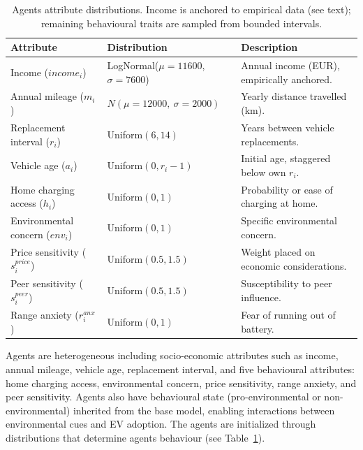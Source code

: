 \documentclass[11pt]{article}
\begin{document}
\begin{table}[ht]
\centering
\caption{Agents attribute distributions. Income is anchored to empirical
data (see text); remaining behavioural traits are sampled from bounded
intervals.}
\label{tab:attributes}
\begin{tabular}{lll}
\toprule
\textbf{Attribute} & \textbf{Distribution} & \textbf{Description} \\
\midrule
Income ($income_i$) & LogNormal($\mu=11600$, $\sigma=7600$) &
  Annual income (EUR), empirically anchored. \\
Annual mileage ($m_i$) & $N(\mu=12000,\ \sigma=2000)$ &
  Yearly distance travelled (km). \\
Replacement interval ($r_i$) & Uniform$(6, 14)$ &
  Years between vehicle replacements. \\
Vehicle age ($a_i$) & Uniform$(0, r_i - 1)$ &
  Initial age, staggered below own $r_i$. \\
Home charging access ($h_i$) & Uniform$(0, 1)$ &
  Probability or ease of charging at home. \\
Environmental concern ($env_i$) & Uniform$(0, 1)$ &
  Specific environmental concern. \\
Price sensitivity ($s^{price}_i$) & Uniform$(0.5, 1.5)$ &
  Weight placed on economic considerations. \\
Peer sensitivity ($s^{peer}_i$) & Uniform$(0.5, 1.5)$ &
  Susceptibility to peer influence. \\
Range anxiety ($r^{anx}_i$) & Uniform$(0, 1)$ &
  Fear of running out of battery. \\
\bottomrule
\end{tabular}
\end{table}

Agents are heterogeneous including socio-economic attributes such as income,
annual mileage, vehicle age, replacement interval, and five behavioural
attributes: home charging access, environmental concern, price sensitivity,
range anxiety, and peer sensitivity. Agents also have behavioural state
(pro-environmental or non-environmental) inherited from the base model,
enabling interactions between environmental cues and EV adoption. The
agents are initialized through distributions that determine agents behaviour
(see Table~\ref{tab:attributes}).
\end{document}

